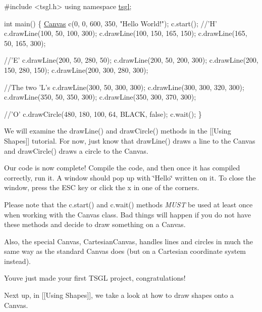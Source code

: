 \begin{DoxyCode}
\textcolor{preprocessor}{#include <tsgl.h>}
\textcolor{keyword}{using namespace }\hyperlink{namespacetsgl}{tsgl};

\textcolor{keywordtype}{int} main() \{
  \hyperlink{classtsgl_1_1_canvas}{Canvas} c(0, 0, 600, 350, \textcolor{stringliteral}{"Hello World!"});
  c.start();
  \textcolor{comment}{//'H'}
  c.drawLine(100, 50, 100, 300);
  c.drawLine(100, 150, 165, 150);
  c.drawLine(165, 50, 165, 300);

  \textcolor{comment}{//'E'}
  c.drawLine(200, 50, 280, 50);
  c.drawLine(200, 50, 200, 300);
  c.drawLine(200, 150, 280, 150);
  c.drawLine(200, 300, 280, 300);

  \textcolor{comment}{//The two 'L's}
  c.drawLine(300, 50, 300, 300);
  c.drawLine(300, 300, 320, 300);
  c.drawLine(350, 50, 350, 300);
  c.drawLine(350, 300, 370, 300);

  \textcolor{comment}{//'O'}
  c.drawCircle(480, 180, 100, 64, BLACK, \textcolor{keyword}{false});
  c.wait();
\}
\end{DoxyCode}


We will examine the draw\+Line() and draw\+Circle() methods in the \mbox{[}\mbox{[}Using Shapes\mbox{]}\mbox{]} tutorial. For now, just know that draw\+Line() draws a line to the Canvas and draw\+Circle() draws a circle to the Canvas.

Our code is now complete! Compile the code, and then once it has compiled correctly, run it. A window should pop up with \char`\"{}\+Hello\char`\"{} written on it. To close the window, press the E\+S\+C key or click the \textquotesingle{}x\textquotesingle{} in one of the corners.

Please note that the c.\+start() and c.\+wait() methods {\itshape M\+U\+S\+T} be used at least once when working with the Canvas class. Bad things will happen if you do not have these methods and decide to draw something on a Canvas.

Also, the special Canvas, Cartesian\+Canvas, handles lines and circles in much the same way as the standard Canvas does (but on a Cartesian coordinate system instead).

You\textquotesingle{}ve just made your first T\+S\+G\+L project, congratulations!

Next up, in \mbox{[}\mbox{[}Using Shapes\mbox{]}\mbox{]}, we take a look at how to draw shapes onto a Canvas. 